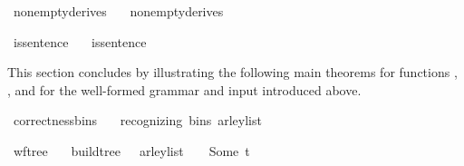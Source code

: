 \begin{isabellebody}
\ nonempty{\isacharunderscore}{\kern0pt}derives{\isacharunderscore}{\kern0pt}{\isasymG}{\isacharcolon}{\kern0pt}\isanewline
\ \ \ {\isachardoublequoteopen}nonempty{\isacharunderscore}{\kern0pt}derives\ {\isasymG}{\isachardoublequoteclose}%
\isadelimproof
%
\endisadelimproof
%
\isatagproof
%
\endisatagproof
{\isafoldproof}%
%
\isadelimproof
%
\endisadelimproof
%
\begin{isamarkuptext}%
%
\end{isamarkuptext}\isamarkuptrue%
\isamarkupfalse%
\ is{\isacharunderscore}{\kern0pt}sentence{\isacharunderscore}{\kern0pt}{\isasymomega}{\isacharcolon}{\kern0pt}\isanewline
\ \ \ {\isachardoublequoteopen}is{\isacharunderscore}{\kern0pt}sentence\ {\isasymG}\ {\isasymomega}{\isachardoublequoteclose}%
\isadelimproof
%
\endisadelimproof
%
\isatagproof
%
\endisatagproof
{\isafoldproof}%
%
\isadelimproof
%
\endisadelimproof
%
\begin{isamarkuptext}%
This section concludes by illustrating the following main theorems for functions , , and
 for the well-formed grammar \isa{{\isasymG}} and input \isa{{\isasymomega}} introduced above.%
\end{isamarkuptext}\isamarkuptrue%
\isamarkupfalse%
\ correctness{\isacharunderscore}{\kern0pt}bins{\isacharcolon}{\kern0pt}\isanewline
\ \ \ {\isachardoublequoteopen}recognizing\ {\isacharparenleft}{\kern0pt}bins\ {\isacharparenleft}{\kern0pt}{\isasymE}arley{\isacharunderscore}{\kern0pt}list\ {\isasymG}\ {\isasymomega}{\isacharparenright}{\kern0pt}{\isacharparenright}{\kern0pt}\ {\isasymG}\ {\isasymomega}\ {\isasymlongleftrightarrow}\ {\isasymG}\ {\isasymturnstile}\ {\isacharbrackleft}{\kern0pt}{\isasymSS}\ {\isasymG}{\isacharbrackright}{\kern0pt}\ {\isasymRightarrow}\isactrlsup {\isacharasterisk}{\kern0pt}\ {\isasymomega}{\isachardoublequoteclose}%
\isadelimproof
%
\endisadelimproof
%
\isatagproof
%
\endisatagproof
{\isafoldproof}%
%
\isadelimproof
%
\endisadelimproof
%
\begin{isamarkuptext}%
%
\end{isamarkuptext}\isamarkuptrue%
\isamarkupfalse%
\ wf{\isacharunderscore}{\kern0pt}tree{\isacharcolon}{\kern0pt}\isanewline
\ \ \ {\isachardoublequoteopen}build{\isacharunderscore}{\kern0pt}tree\ {\isasymG}\ {\isasymomega}\ {\isacharparenleft}{\kern0pt}{\isasymE}arley{\isacharunderscore}{\kern0pt}list\ {\isasymG}\ {\isasymomega}{\isacharparenright}{\kern0pt}\ {\isacharequal}{\kern0pt}\ Some\ t{\isachardoublequoteclose}\isanewline

\end{isabellebody}
